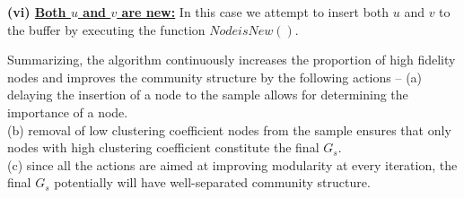 \noindent\textbf{(vi) \underline{Both $u$ and $v$ are new:}}
In this case we attempt to insert both $u$ and $v$ to the buffer by executing the function $NodeisNew()$. 

Summarizing, the algorithm continuously increases the proportion of high fidelity nodes and 
improves the community structure by the following actions -- 
(a) delaying the insertion of a node to the sample allows for determining the importance of a node.\\
(b) removal of low clustering coefficient nodes from the sample ensures that only nodes with high clustering coefficient constitute the final $G_s$.  \\
(c) since all the actions are aimed at improving  modularity at every iteration, the final $G_s$ potentially will have 
 well-separated community structure.   


